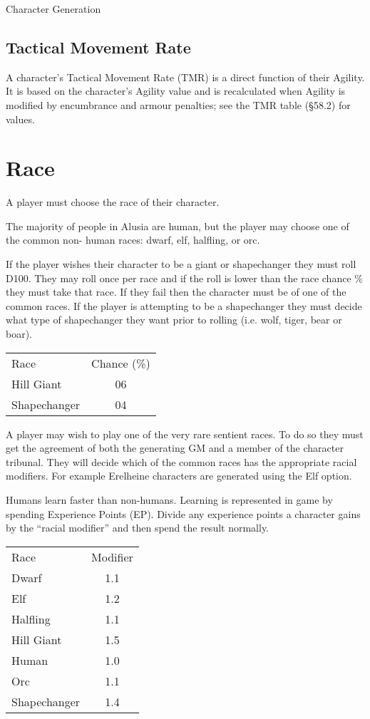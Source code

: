 \begin{Chapter}{Character Generation}
\subsection{Tactical Movement Rate}

A character’s Tactical Movement Rate (TMR) is a direct function of
their Agility.  It is based on the character’s Agility value and is
recalculated when Agility is modified by encumbrance and armour
penalties; see the TMR table (§58.2) for values.

\section{Race}
\label{race}

A player must choose the race of their character.

The majority of people in Alusia are human, but the player may choose
one of the common non- human races: dwarf, elf, halfling, or orc.

If the player wishes their character to be a giant or shapechanger
they must roll D100.  They may roll once per race and if the roll is
lower than the race chance \% they must take that race. If they fail
then the character must be of one of the common races.  If the player
is attempting to be a shapechanger they must decide what type of
shapechanger they want prior to rolling (i.e. wolf, tiger, bear or
boar).

\begin{tabularx}{\columnwidth}{Xc}
Race		& Chance (\%) \\
Hill Giant	& 06 \\
Shapechanger	& 04 \\
\end{tabularx}

A player may wish to play one of the very rare sentient races.  To do
so they must get the agreement of both the generating GM and a member
of the character tribunal.  They will decide which of the common races
has the appropriate racial modifiers.  For example Erelheine
characters are generated using the Elf option.

Humans learn faster than non-humans. Learning is represented in game
by spending Experience Points (EP).  Divide any experience points a
character gains by the “racial modifier” and then spend the result
normally.

\begin{tabularx}{\columnwidth}{Xc}
Race		& Modifier \\
Dwarf		& 1.1 \\
Elf		& 1.2 \\
Halfling	& 1.1 \\
Hill Giant	& 1.5 \\
Human		& 1.0 \\
Orc		& 1.1 \\
Shapechanger	& 1.4 \\
\end{tabularx}


\end{Chapter}
